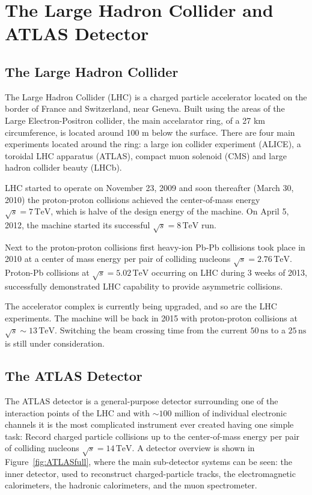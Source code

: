 \documentclass[a4paper,11pt]{report}
\newcommand{\TeV}{\,\text{TeV}}
\newcommand{\rts}{\sqrt{s}}
\begin{document}
\section{The Large Hadron Collider and ATLAS Detector}

\subsection{The Large Hadron Collider}

The Large Hadron Collider (LHC) \cite{LHC, LHCPastPresentFuture} is a charged
particle accelerator located on the border of France and Switzerland, near
Geneva. Built using the areas of the Large Electron-Positron collider, the main
accelarator ring, of a 27 km circumference, is located around 100 m below the
surface. There are four main experiments located around the ring: a large ion
collider experiment (ALICE), a toroidal LHC apparatus (ATLAS), compact muon
solenoid (CMS) and large hadron collider beauty (LHCb).

LHC started to operate on November 23, 2009 and soon thereafter (March 30, 2010)
the proton-proton collisions achieved the center-of-mass energy $\sqrt{s} = 7
\TeV$, which is halve of the design energy of the machine. On April 5, 2012, the
machine started its successful $\sqrt{s} = 8 \TeV$ run.

Next to the proton-proton collisions first heavy-ion Pb-Pb collisions took place
in 2010 at a center of mass energy per pair of colliding nucleons $\sqrt{s} =
2.76 \TeV$. Proton-Pb collisions at $\sqrt{s} = 5.02 \TeV$ occurring on LHC
during 3 weeks of 2013, successfully demonstrated LHC capability to provide
asymmetric collisions.  

The accelerator complex is currently being upgraded, and so are the LHC
experiments. The machine will be back in 2015 with proton-proton collisions at
$\sqrt{s} \sim 13 \TeV$. Switching the beam crossing time from the current $50
\, \mbox{ns}$ to a $25 \, \mbox{ns}$ is still under consideration.

\subsection{The ATLAS Detector}

The ATLAS detector \cite{ATLAS} is a general-purpose detector surrounding one of
the interaction points of the LHC and with $\sim 100$ million of individual
electronic channels it is the most complicated instrument ever created having
one simple task: Record charged particle collisions up to the center-of-mass
energy per pair of colliding nucleons $\rts = 14 \TeV$. A detector overview is
shown in Figure~\ref{fig:ATLASfull}, where the main sub-detector systems can be
seen: the inner detector, used to reconstruct charged-particle tracks, the
electromagnetic calorimeters, the hadronic calorimeters, and the muon
spectrometer. 
\end{document}
